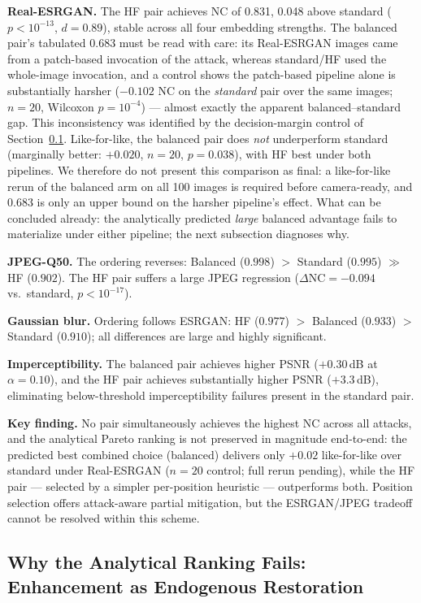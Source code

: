\documentclass[conference]{IEEEtran}
\begin{document}
\textbf{Real-ESRGAN.} The HF pair achieves NC of 0.831, 0.048 above
standard ($p < 10^{-13}$, $d = 0.89$), stable across all four embedding
strengths. The balanced pair's tabulated 0.683 must be read with care:
its Real-ESRGAN images came from a patch-based invocation of the attack,
whereas standard/HF used the whole-image invocation, and a control shows
the patch-based pipeline alone is substantially harsher ($-0.102$ NC on
the \emph{standard} pair over the same images; $n=20$, Wilcoxon
$p=10^{-4}$) --- almost exactly the apparent balanced--standard gap.
This inconsistency was identified by the decision-margin control of
Section~\ref{sec:margin}. Like-for-like, the balanced pair does
\emph{not} underperform standard (marginally better: $+0.020$, $n=20$,
$p=0.038$), with HF best under both pipelines. We therefore do not
present this comparison as final: a like-for-like rerun of the balanced
arm on all 100 images is required before camera-ready, and 0.683 is
only an upper bound on the harsher pipeline's effect. What can be
concluded already: the analytically predicted \emph{large} balanced
advantage fails to materialize under either pipeline; the next
subsection diagnoses why.

\textbf{JPEG-Q50.} The ordering reverses: Balanced ($0.998$) $>$ Standard
($0.995$) $\gg$ HF ($0.902$). The HF pair suffers a large JPEG regression
($\Delta\mathrm{NC} = -0.094$ vs.\ standard, $p < 10^{-17}$).

\textbf{Gaussian blur.} Ordering follows ESRGAN: HF ($0.977$) $>$
Balanced ($0.933$) $>$ Standard ($0.910$); all differences are large and
highly significant.

\textbf{Imperceptibility.} The balanced pair achieves higher PSNR
($+0.30$\,dB at $\alpha=0.10$), and the HF pair achieves substantially
higher PSNR ($+3.3$\,dB), eliminating below-threshold imperceptibility
failures present in the standard pair.

\textbf{Key finding.} No pair simultaneously achieves the highest NC
across all attacks, and the analytical Pareto ranking is not preserved
in magnitude end-to-end: the predicted best combined choice (balanced)
delivers only $+0.02$ like-for-like over standard under Real-ESRGAN
($n=20$ control; full rerun pending), while the HF pair --- selected by
a simpler per-position heuristic --- outperforms both. Position
selection offers attack-aware partial mitigation, but the ESRGAN/JPEG
tradeoff cannot be resolved within this scheme.

\subsection{Why the Analytical Ranking Fails: Enhancement as Endogenous
Restoration}
\label{sec:margin}
\end{document}
